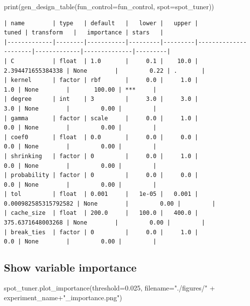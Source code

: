 \documentclass[
  letterpaper,
  DIV=11,
  numbers=noendperiod]{scrreprt}
\newenvironment{Shaded}{\begin{snugshade}}{\end{snugshade}}
\newcommand{\BuiltInTok}[1]{\textcolor[rgb]{0.00,0.23,0.31}{#1}}
\newcommand{\FloatTok}[1]{\textcolor[rgb]{0.68,0.00,0.00}{#1}}
\newcommand{\NormalTok}[1]{\textcolor[rgb]{0.00,0.23,0.31}{#1}}
\newcommand{\OperatorTok}[1]{\textcolor[rgb]{0.37,0.37,0.37}{#1}}
\newcommand{\StringTok}[1]{\textcolor[rgb]{0.13,0.47,0.30}{#1}}
\begin{document}
\begin{Shaded}
\begin{Highlighting}[]
\BuiltInTok{print}\NormalTok{(gen\_design\_table(fun\_control}\OperatorTok{=}\NormalTok{fun\_control,}
\NormalTok{    spot}\OperatorTok{=}\NormalTok{spot\_tuner))}
\end{Highlighting}
\end{Shaded}

\begin{verbatim}
| name        | type   | default   |   lower |   upper |                tuned | transform   |   importance | stars   |
|-------------|--------|-----------|---------|---------|----------------------|-------------|--------------|---------|
| C           | float  | 1.0       |     0.1 |    10.0 |    2.394471655384338 | None        |         0.22 | .       |
| kernel      | factor | rbf       |     0.0 |     1.0 |                  1.0 | None        |       100.00 | ***     |
| degree      | int    | 3         |     3.0 |     3.0 |                  3.0 | None        |         0.00 |         |
| gamma       | factor | scale     |     0.0 |     1.0 |                  0.0 | None        |         0.00 |         |
| coef0       | float  | 0.0       |     0.0 |     0.0 |                  0.0 | None        |         0.00 |         |
| shrinking   | factor | 0         |     0.0 |     1.0 |                  0.0 | None        |         0.00 |         |
| probability | factor | 0         |     0.0 |     0.0 |                  0.0 | None        |         0.00 |         |
| tol         | float  | 0.001     |   1e-05 |   0.001 | 0.000982585315792582 | None        |         0.00 |         |
| cache_size  | float  | 200.0     |   100.0 |   400.0 |    375.6371648003268 | None        |         0.00 |         |
| break_ties  | factor | 0         |     0.0 |     1.0 |                  0.0 | None        |         0.00 |         |
\end{verbatim}

\hypertarget{show-variable-importance}{%
\subsection{Show variable importance}\label{show-variable-importance}}

\begin{Shaded}
\begin{Highlighting}[]
\NormalTok{spot\_tuner.plot\_importance(threshold}\OperatorTok{=}\FloatTok{0.025}\NormalTok{, filename}\OperatorTok{=}\StringTok{"./figures/"} \OperatorTok{+}\NormalTok{ experiment\_name}\OperatorTok{+}\StringTok{"\_importance.png"}\NormalTok{)}
\end{Highlighting}
\end{Shaded}
\end{document}
